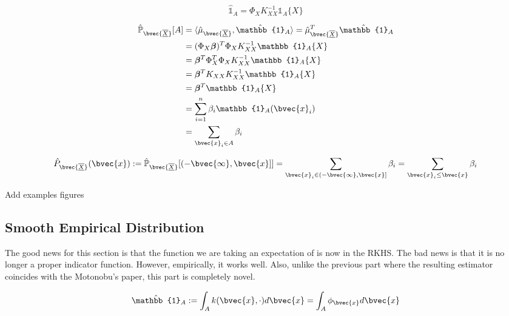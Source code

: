 \documentclass[twoside]{article} \usepackage{aistats2017}
\newcommand{\rv}[1]{\underline{\overline{#1}}}
\newcommand{\warn}[1]{{\color{red} #1}}
\begin{document}
		\begin{equation}
			\hat{\mathbb{1}}_{A} = \Phi_{X} K_{X X}^{-1} \mathbb{1}_{A}\{X\}
		\end{equation}
		
		\begin{equation}
		\begin{aligned}
			\hat{\mathbb{P}}_{\bvec{\rv{X}}}[A] &= \langle \hat{\mu}_{\bvec{\rv{X}}}, \hat{\mathbb{1}}_{A} \rangle = \hat{\mu}_{\bvec{\rv{X}}}^{T}\hat{\mathbb{1}}_{A} \\
			&= (\Phi_{X} \bm{\beta})^{T} \Phi_{X} K_{X X}^{-1} \mathbb{1}_{A}\{X\} \\
			&= \bm{\beta}^{T} \Phi_{X}^{T} \Phi_{X} K_{X X}^{-1} \mathbb{1}_{A}\{X\} \\
			&= \bm{\beta}^{T} K_{X X} K_{X X}^{-1} \mathbb{1}_{A}\{X\} \\
			&= \bm{\beta}^{T} \mathbb{1}_{A}\{X\} \\
			&= \sum_{i = 1}^{n} \beta_{i} \mathbb{1}_{A}(\bvec{x}_{i}) \\
			&= \sum_{\bvec{x}_{i} \in A} \beta_{i}
		\end{aligned}
		\label{eq:empirical_distribution}
		\end{equation}
		
		\begin{equation}
			\hat{P}_{\bvec{\rv{X}}}(\bvec{x}) := \hat{\mathbb{P}}_{\bvec{\rv{X}}}[(-\bvec{\infty}, \bvec{x}]] = \sum_{\bvec{x}_{i} \in (-\bvec{\infty}, \bvec{x}]} \beta_{i} = \sum_{\bvec{x}_{i} \leq \bvec{x}} \beta_{i}
		\label{eq:empirical_cdf}
		\end{equation}
		
		\warn{Add examples figures}
	
	\subsection{Smooth Empirical Distribution}
	
		\warn{The good news for this section is that the function we are taking an expectation of is now in the RKHS. The bad news is that it is no longer a proper indicator function. However, empirically, it works well. Also, unlike the previous part where the resulting estimator coincides with the Motonobu's paper, this part is completely novel.}
		
		\begin{equation}
		\hat{\mathbb{1}}_{A} := \int_{A} k(\bvec{x}, \cdot) d\bvec{x} = \int_{A} \phi_{\bvec{x}} d\bvec{x}
		\end{equation}
		
\end{document}
